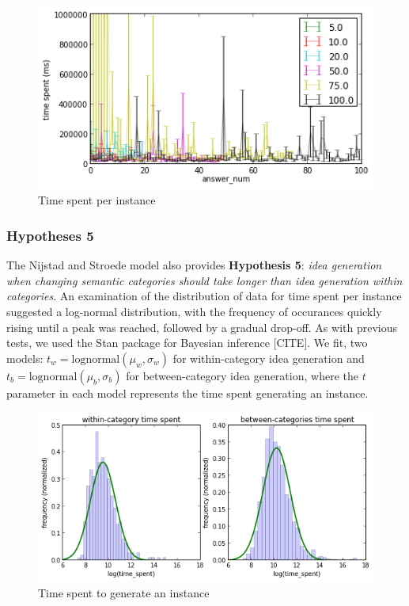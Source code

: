 \begin{figure}[h]
    \centering
    \includegraphics[width=0.9\columnwidth]{time_spent_order}
    \caption{Time spent per instance}
\end{figure}

\subsubsection{Hypotheses 5}

The Nijstad and Stroede \cite{nijstad_how_2006} model also provides \textbf{Hypothesis 5}: \emph{idea generation when changing semantic categories should take longer than idea generation within categories}. An examination of the distribution of data for time spent per instance suggested a log-normal distribution, with the frequency of occurances quickly rising until a peak was reached, followed by a gradual drop-off. As with previous tests, we used the Stan package for Bayesian inference [CITE]. We fit, two models: $t_w = \text{lognormal}(\mu_w, \sigma_w)$ for within-category idea generation and $t_b = \text{lognormal}(\mu_b, \sigma_b)$ for between-category idea generation, where the $t$ parameter in each model represents the time spent generating an instance.

\begin{figure}[h]
    \centering
    \includegraphics[width=0.9\columnwidth]{hyp5_comparison}
    \caption{Time spent to generate an instance}
\end{figure}

